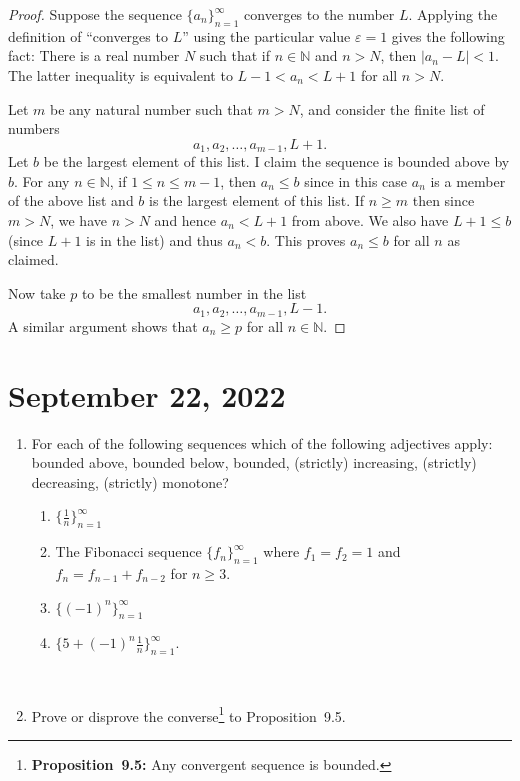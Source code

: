 \documentclass[12pt]{amsart}
\def\e{\varepsilon}
\newcommand{\N}{\mathbb{N}}
\numberwithin{equation}{section}
\theoremstyle{plain} %
\newcommand{\Sept}[1]{\section{September #1, 2022}}
\theoremstyle{definition}
\theoremstyle{remark}
\begin{document}
\begin{proof} Suppose the sequence $\{a_n\}_{n=1}^\infty$ converges to
	the number $L$. Applying the definition of ``converges to $L$'' using the particular value $\e = 1$ gives the following fact:
	There is a real number $N$ such that if $n \in \N$ and $n > N$, then $|a_n -
	L| < 1$. The latter inequality is equivalent to  $L-1 < a_n < L+1$
	for all $n > N$.
	
	Let $m$ be any natural number such that $m > N$,
	and consider the finite list of numbers
	$$
	a_1, a_2, \dots, a_{m-1}, L + 1.
	$$
	Let $b$ be the largest element of this list. I claim the sequence is bounded above by $b$.
	For any $n \in  \N$, if $1 \leq n \leq m-1$, then $a_n \leq b$ since in this case $a_n$ is a member of the above list and $b$ is the largest element of this list.
	If $n \geq m$ then since $m > N$, we have $n > N$ and hence $a_n < L + 1$ from above. We also have $L + 1 \leq b$ (since $L+1$ is in the list) and thus $a_n < b$. 
	This proves $a_n \leq b$ for all $n$ as claimed.
	
	Now take $p$ to be the smallest number in the list
	$$
	a_1, a_2, \dots, a_{m-1}, L - 1.
	$$
	A similar argument shows that $a_n \geq p$ for all $n \in \N$.
\end{proof}

\Sept{22}

\begin{enumerate}

\item For each of the following sequences which of the following adjectives apply: bounded above, bounded below, bounded, (strictly) increasing, (strictly) decreasing, (strictly) monotone?
\begin{enumerate}
\item $\{ \frac{1}{n} \}_{n=1}^\infty$
\item The Fibonacci sequence $\{ f_n \}_{n=1}^\infty$ where $f_1=f_2=1$ and $f_n= f_{n-1} + f_{n-2}$ for $n\geq 3$.
\item $\{(-1)^n \}_{n=1}^\infty$
\item $\{ 5 + (-1)^n \frac{1}{n}  \}_{n=1}^\infty$.
\end{enumerate}

\

\item Prove or disprove the converse\footnote{\textbf{Proposition~9.5:} Any convergent sequence is bounded.} to Proposition~9.5.



\end{enumerate}
\end{document}
